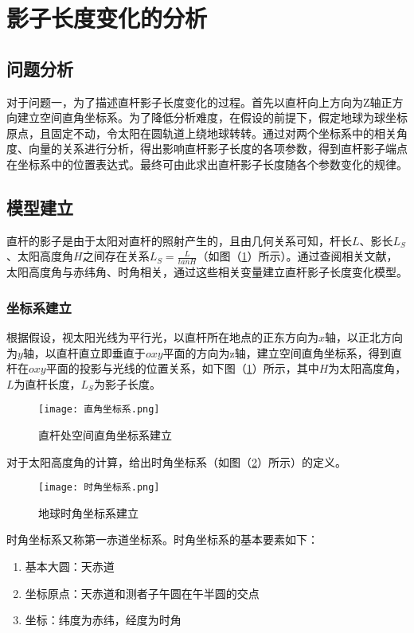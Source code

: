 \documentclass[withoutpreface,bwprint]{cumcmthesis} %
\begin{document}
\section{影子长度变化的分析}
\subsection{问题分析}
对于问题一，为了描述直杆影子长度变化的过程。首先以直杆向上方向为Z轴正方向建立空间直角坐标系。为了降低分析难度，在假设的前提下，假定地球为球坐标原点，且固定不动，令太阳在圆轨道上绕地球转转。通过对两个坐标系中的相关角度、向量的关系进行分析，得出影响直杆影子长度的各项参数，得到直杆影子端点在坐标系中的位置表达式。最终可由此求出直杆影子长度随各个参数变化的规律。
\subsection{模型建立}
\par 直杆的影子是由于太阳对直杆的照射产生的，且由几何关系可知，杆长$L$、影长$L_S$、太阳高度角$H$之间存在关系$L_S = \frac{L}{tan H}$（如图（\ref{fig:q1-1}）所示）。通过查阅相关文献，太阳高度角与赤纬角、时角相关，通过这些相关变量建立直杆影子长度变化模型。
\subsubsection{坐标系建立}
\par 根据假设，视太阳光线为平行光，以直杆所在地点的正东方向为$x$轴，以正北方向为$y$轴，以直杆直立即垂直于$oxy$平面的方向为z轴，建立空间直角坐标系，得到直杆在$oxy$平面的投影与光线的位置关系，如下图（\ref{fig:q1-1}）所示，其中$H$为太阳高度角，$L$为直杆长度，$L_S$为影子长度。
\begin{figure}[h]
\small
\centering
\texttt{[image: 直角坐标系.png]}
\caption{直杆处空间直角坐标系建立} \label{fig:q1-1}
\end{figure}
\par 对于太阳高度角的计算，给出时角坐标系（如图（\ref{fig:q1-2}）所示）的定义。
\begin{figure}[h]
\small
\centering
\texttt{[image: 时角坐标系.png]}
\caption{地球时角坐标系建立} \label{fig:q1-2}
\end{figure}
\par 时角坐标系又称第一赤道坐标系。时角坐标系的基本要素如下：
\begin{enumerate}
	\item 基本大圆：天赤道
	\item 坐标原点：天赤道和测者子午圆在午半圆的交点
	\item 坐标：纬度为赤纬，经度为时角
\end{enumerate}
\end{document}
